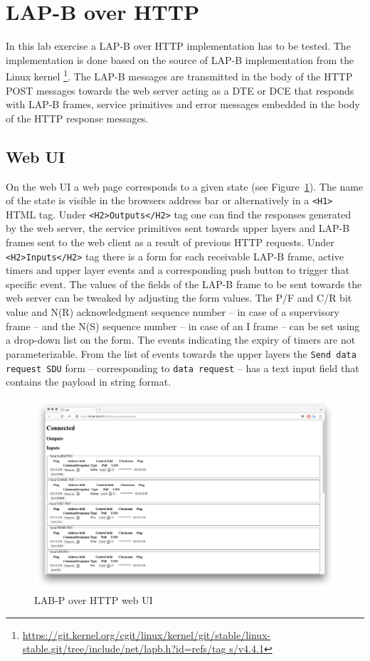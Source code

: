 \documentclass[a4paper]{article}
\begin{document}
\section{LAP-B over HTTP}

In this lab exercise a LAP-B over HTTP implementation has to be tested. The implementation is done based on the source
of LAP-B implementation from the Linux kernel
\footnote{\url{https://git.kernel.org/cgit/linux/kernel/git/stable/linux-stable.git/tree/include/net/lapb.h?id=refs/tag
        s/v4.4.1}}. The LAP-B messages are transmitted in the body of the HTTP POST messages towards the web server acting as a
DTE or DCE that responds with LAP-B frames, service primitives and error messages embedded in the body of the HTTP
response messages.

\subsection{Web UI}

On the web UI a web page corresponds to a given state (see Figure~\ref{fig:web}). The name of the state is visible in
the browsers address bar or alternatively in  a \verb!<H1>! HTML tag.
Under \verb!<H2>Outputs</H2>! tag one can find the responses generated by the web server, the service primitives
sent towards upper layers and LAP-B frames sent to the web client as a result of previous HTTP requests.
Under \verb!<H2>Inputs</H2>! tag there is a form for each receivable LAP-B frame, active timers and upper layer
events and a corresponding push button to trigger that specific event. The values of the fields of the LAP-B frame to
be sent towards the web server can be tweaked by adjusting the form values. The P/F and C/R bit value and N(R)
acknowledgment sequence number -- in case of a supervisory frame -- and the N(S) sequence number -- in case of an I
frame --  can be set using a drop-down list on the form. The events indicating the expiry of timers are not
parameterizable. From the list of events towards the upper layers the \verb!Send data request SDU! form -- corresponding
to \verb!data request! -- has a text input field that contains the payload in string format.

\begin{figure}[!htb]
    \centering
    \includegraphics[width=\textwidth]{figures/web.png}
    \caption{LAB-P over HTTP web UI}
    \label{fig:web}
\end{figure}
\end{document}
